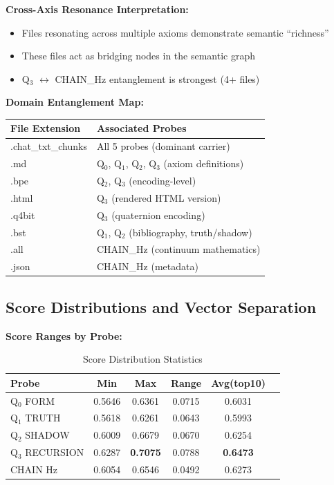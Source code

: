 \textbf{Cross-Axis Resonance Interpretation:}
\begin{itemize}
    \item Files resonating across multiple axioms demonstrate semantic ``richness''
    \item These files act as bridging nodes in the semantic graph
    \item Q$_3$ $\leftrightarrow$ CHAIN\_Hz entanglement is strongest (4+ files)
\end{itemize}

\textbf{Domain Entanglement Map:}
\begin{table}[h]
\centering
\begin{tabular}{ll}
\toprule
File Extension & Associated Probes \\
\midrule
.chat\_txt\_chunks & All 5 probes (dominant carrier) \\
.md & Q$_0$, Q$_1$, Q$_2$, Q$_3$ (axiom definitions) \\
.bpe & Q$_2$, Q$_3$ (encoding-level) \\
.html & Q$_3$ (rendered HTML version) \\
.q4bit & Q$_3$ (quaternion encoding) \\
.bst & Q$_1$, Q$_2$ (bibliography, truth/shadow) \\
.all & CHAIN\_Hz (continuum mathematics) \\
.json & CHAIN\_Hz (metadata) \\
\bottomrule
\end{tabular}
\end{table}

\subsection{Score Distributions and Vector Separation}

\textbf{Score Ranges by Probe:}
\begin{table}[h]
\centering
\caption{Score Distribution Statistics}
\begin{tabular}{lccccc}
\toprule
Probe & Min & Max & Range & Avg(top10) \\
\midrule
Q$_0$ FORM & 0.5646 & 0.6361 & 0.0715 & 0.6031 \\
Q$_1$ TRUTH & 0.5618 & 0.6261 & 0.0643 & 0.5993 \\
Q$_2$ SHADOW & 0.6009 & 0.6679 & 0.0670 & 0.6254 \\
Q$_3$ RECURSION & 0.6287 & \textbf{0.7075} & 0.0788 & \textbf{0.6473} \\
CHAIN Hz & 0.6054 & 0.6546 & 0.0492 & 0.6273 \\
\bottomrule
\end{tabular}
\end{table}

